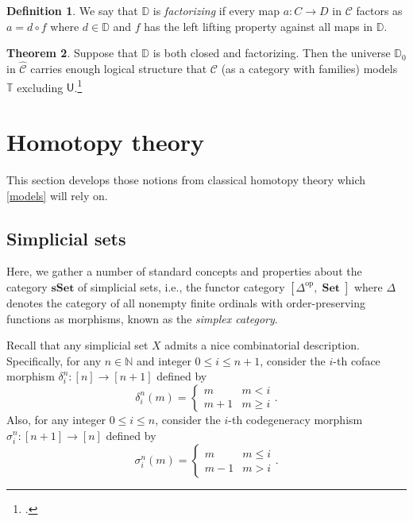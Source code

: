 \documentclass[10pt,letterpaper,cm]{nupset}
\theoremstyle{definition}
\newtheorem{definition}{Definition}[subsection]
\theoremstyle{theorem}
\newtheorem{theorem}[definition]{Theorem}
\theoremstyle{remark}
\newcommand{\U}{\mathsf{U}}
\newcommand{\0}{\mathbf{0}}
\newcommand{\1}{\mathbf{1}}
\newcommand{\2}{\mathbf{2}}
\DeclareMathOperator{\op}{op}
\DeclareMathOperator{\set}{\mathbf{Set}}
\renewcommand{\c}{\mathscr{C}}
\newcommand{\N}{\mathbb N}
\begin{document}
\begin{definition}
We say that $\mathbb{D}$ is \textit{factorizing} if every map $a: C \to D$ in $\c$ factors as $a =d\circ f$ where $d\in \mathbb{D}$ and $f$ has the left lifting property against all maps in $\mathbb{D}$.
\end{definition}

\begin{theorem}\label{Awthm}
Suppose that $\mathbb{D}$ is both closed and factorizing. Then the universe $\mathbb{D}_0$ in $\widehat{\c}$ carries enough logical structure  that $\c$ (as a category with families) models $\mathbb{T}$ excluding $\U$.\footnote{\cite[Theorem 32]{Nat}.}
\end{theorem}

\section{Homotopy theory}\label{htpy}

This section develops those notions from classical homotopy theory which  \cref{models} will rely on.

\subsection{Simplicial sets}

Here, we gather a number of standard concepts and properties about the category $\mathbf{sSet}$ of simplicial sets, i.e., the functor category $\left[\varDelta^{\op}, \set\right]$ where $\varDelta$ denotes the category of all nonempty finite  ordinals with order-preserving functions as morphisms, known as the \textit{simplex category}.

\bigskip

Recall that any simplicial set $X$ admits a nice combinatorial description. Specifically, for any $n\in \N$ and integer $0 \leq i \leq n+1$, consider the $i$-th coface morphism $\delta_i^n: \left[n\right] \to \left[n+1\right]$ defined by 
\[
\delta_i^n(m) = \begin{cases}
m &  m < i
\\ m+1 & m \geq i
\end{cases}.
\]
Also, for any integer $0 \leq i \leq n$, consider the $i$-th codegeneracy morphism $\sigma_i^n: \left[n+1\right] \to \left[n\right]$ defined by
\[
\sigma_i^n(m) = \begin{cases}
m &  m \leq  i
\\ m-1 & m > i
\end{cases}.
\] 
\end{document}

